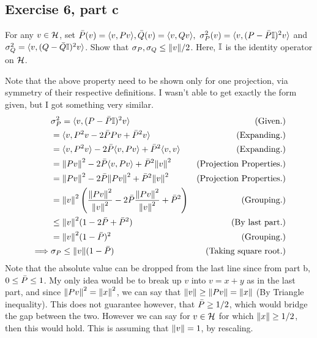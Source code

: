 \subsection{Exercise 6, part c}
For any $v \in \mathcal{H}$, set $\Bar{P}(v) = \langle v, Pv \rangle, \Bar{Q}(v) = \langle v, Qv \rangle, \ \sigma^2_P(v) = \langle v, (P - \Bar{P} \mathbb{I})^2 v \rangle$ and $\sigma_Q^2 = \langle v, (Q - \Bar{Q} \mathbb{I})^2 v \rangle$. Show that $\sigma_P, \sigma_Q \leq \norm{v} / 2$. Here, $\mathbb{I}$ is the identity operator on $\mathcal{H}$.  
\partbreak
\begin{solution}

    Note that the above property need to be shown only for one projection, via symmetry of their respective definitions. I wasn't able to get exactly the form given, but I got something very similar.
    \tightalignbreak
    \begin{align*}
        &\sigma_P^2 = \langle v, (P - \Bar{P} \mathbb{I})^2v \rangle &\text{(Given.)}\\
        &= \langle v, P^2v - 2\Bar{P} Pv + \Bar{P}^2 v \rangle &\text{(Expanding.)}\\
        &= \langle v, P^2v \rangle - 2\Bar{P} \langle v, Pv \rangle + \Bar{P}^2 \langle v, v \rangle &\text{(Expanding.)}\\
        &= \norm{Pv}^2 - 2\Bar{P} \langle v, Pv \rangle + \Bar{P}^2 \norm{v}^2 &\text{(Projection Properties.)}\\
        &= \norm{Pv}^2 - 2\Bar{P}\norm{Pv}^2 + \Bar{P}^2\norm{v}^2 &\text{(Projection Properties.)}\\
        &= \norm{v}^2\left(\frac{\norm{Pv}^2}{\norm{v}^2} - 2\Bar{P}\frac{\norm{Pv}^2}{\norm{v}^2} + \Bar{P}^2\right) &\text{(Grouping.)}\\
        &\leq \norm{v}^2 (1 - 2\Bar{P} + \Bar{P}^2) &\text{(By last part.)}\\
        &= \norm{v}^2(1 - \Bar{P})^2 &\text{(Grouping.)}\\
        \implies &\sigma_P \leq \norm{v}(1 - \Bar{P}) &\text{(Taking square root.)}
    \end{align*}\vspace{-12mm}\alignbreak
    Note that the absolute value can be dropped from the last line since from part b, $ 0 \leq \Bar{P} \leq 1$. My only idea would be to break up $v$ into $v = x + y$ as in the last part, and since $\norm{Pv}^2 = \norm{x}^2$, we can say that $\norm{v} \geq \norm{Pv} = \norm{x}$ (By Triangle inequality). This does not guarantee however, that $\Bar{P} \geq 1/2$, which would bridge the gap between the two. However we can say for $v \in \mathcal{H}$ for which $\norm{x} \geq 1/2$, then this would hold. This is assuming that $\norm{v} = 1$, by rescaling.  
\end{solution}

